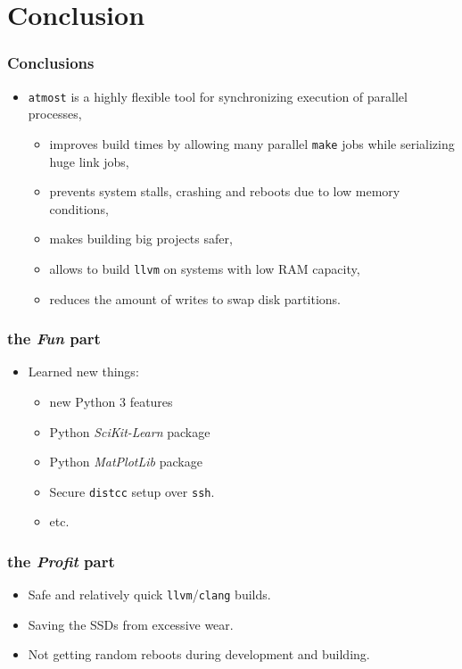 \documentclass[compress,table,xcolor=table]{beamer}
\newcommand{\shelltext}[1]{\texttt{\colorbox{light-gray}{#1}}}
\begin{document}
\section{Conclusion}
\begin{frame}
  \frametitle{Conclusions}
  \begin{itemize}
    \Large
    \item \shelltext{atmost} is a highly flexible tool for synchronizing
      execution of parallel processes,
    \begin{itemize}
    \large
    \item improves build times by allowing many
      parallel \shelltext{make} jobs while serializing huge link jobs,
    \item prevents system stalls, crashing and reboots due to low memory conditions,
    \item makes building big projects safer,
    \item allows to build \shelltext{llvm} on systems with low RAM capacity,
    \item reduces the amount of writes to swap disk partitions.
    \end{itemize}
  \end{itemize}
\end{frame}
\begin{frame}
  \frametitle{the {\em Fun} part}
  \begin{itemize}
    \LARGE
    \item Learned new things:
    \Large
    \begin{itemize}
      \item new Python 3 features
      \item Python {\em SciKit-Learn} package
      \item Python {\em MatPlotLib} package
      \item Secure \shelltext{distcc} setup over \shelltext{ssh}.
      \item etc.
    \end{itemize}
  \end{itemize}
\end{frame}
\begin{frame}
  \frametitle{the {\em Profit} part}
  \begin{itemize}
    \LARGE
    \item Safe and relatively quick \shelltext{llvm}/\shelltext{clang} builds.
    \item Saving the SSDs from excessive wear.
    \item Not getting random reboots during development and building.
  \end{itemize}
\end{frame}
\end{document}
